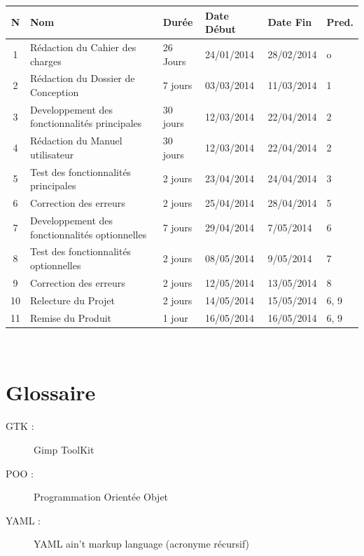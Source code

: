 \documentclass[11pt]{article}
\begin{document}
\vspace{0,5cm}
\small
\begin{tabular}{|c|l|l|l|l|l|}
    \hline
	\textbf{N} & \textbf{Nom} & \textbf{Durée} & \textbf{Date Début} & \textbf{Date Fin} & \textbf{Pred.}\\
	\hline
    \hline
		1 & Rédaction du Cahier des charges 					& 26 Jours 	& 24/01/2014 & 28/02/2014 	& o		\\ \cline{1-6}
		2 & Rédaction du Dossier de Conception 					& 7 jours 	& 03/03/2014 & 11/03/2014 	& 1  	\\	\cline{1-6}	
    	3 & Developpement des fonctionnalités principales		& 30 jours 	& 12/03/2014 & 22/04/2014 	& 2 	\\	\cline{1-6}	
		4 & Rédaction du Manuel utilisateur 					& 30 jours 	& 12/03/2014 & 22/04/2014 	& 2  	\\	\cline{1-6}	
		5 & Test des fonctionnalités principales				& 2 jours 	& 23/04/2014 & 24/04/2014 	& 3  	\\	\cline{1-6}
        6 & Correction des erreurs 								& 2 jours 	& 25/04/2014 & 28/04/2014 	& 5		\\ \cline{1-6}
        7 & Developpement des fonctionnalités optionnelles 		& 7 jours 	& 29/04/2014 & 7/05/2014 	& 6 	\\ \cline{1-6}
        8 & Test des fonctionnalités optionnelles 				& 2 jours 	& 08/05/2014 & 9/05/2014 	& 7 	\\ \cline{1-6}
        9 & Correction des erreurs 								& 2 jours 	& 12/05/2014 & 13/05/2014 	& 8 	\\ \cline{1-6}
       10 & Relecture du Projet 								& 2 jours 	& 14/05/2014 & 15/05/2014 	& 6, 9 	\\ \cline{1-6}
       11 & Remise du Produit 									& 1 jour 	& 16/05/2014 & 16/05/2014 	& 6, 9 	\\ \cline{1-6}
	\hline
\end{tabular}
\normalsize \\



\section{Glossaire}

\begin{description}
\item [GTK : ]Gimp ToolKit
\item [POO : ]Programmation Orientée Objet
\item [YAML : ]YAML ain't markup language (acronyme récursif)
\end{description}

\renewcommand{\thefootnote}{\*} %
\end{document}
